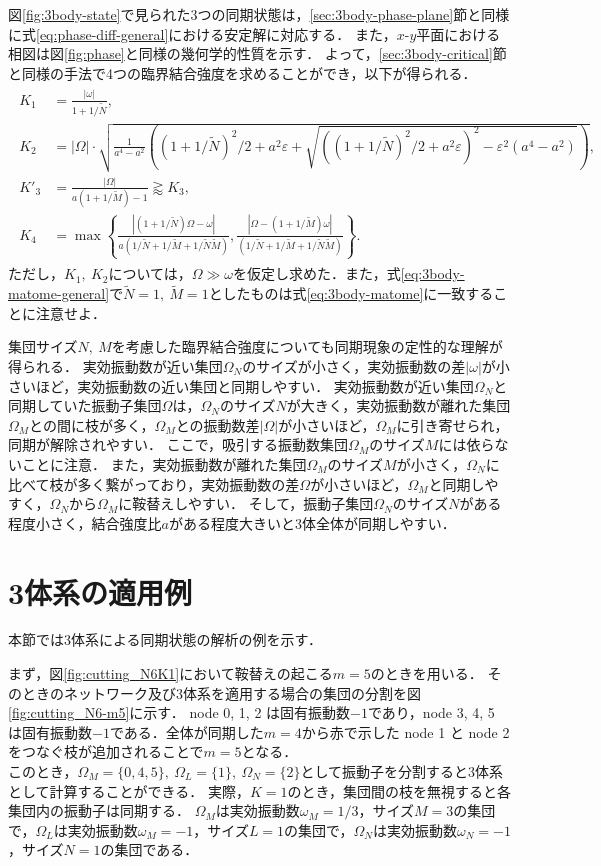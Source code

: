 \documentclass[../main]{subfiles}
\begin{document}
図\ref{fig:3body-state}で見られた3つの同期状態は，\ref{sec:3body-phase-plane}節と同様に式\eqref{eq:phase-diff-general}における安定解に対応する．
また，$x$-$y$平面における相図は図\ref{fig:phase}と同様の幾何学的性質を示す．
よって，\ref{sec:3body-critical}節と同様の手法で4つの臨界結合強度を求めることができ，以下が得られる．
\begin{align}
    \label{eq:3body-matome-general}
    \begin{split}
        K_1&=\frac{|\omega|}{1+1/\tilde{N}},\\
        K_2&=|\Omega|\cdot\sqrt{\frac{1}{a^4-a^2}\left((1+1/\tilde{N})^2/2+a^2\varepsilon+\sqrt{((1+1/\tilde{N})^2/2+a^2\varepsilon)^2-\varepsilon^2(a^4-a^2)}\right)},\\
        K'_3&=\frac{|\Omega|}{a(1+1/\tilde{M})-1}\gtrapprox K_3,\\
        K_4&=\max\left\{\frac{|(1+1/\tilde{N})\Omega-\omega|}{a(1/\tilde{N}+1/\tilde{M}+1/\tilde{N}\tilde{M})},\frac{|\Omega-(1+1/\tilde{M})\omega|}{(1/\tilde{N}+1/\tilde{M}+1/\tilde{N}\tilde{M})}\right\}.
    \end{split}
\end{align}
ただし，$K_1,\ K_2$については，$\Omega\gg\omega$を仮定し求めた．また，式\eqref{eq:3body-matome-general}で$\tilde{N}=1,\ \tilde{M}=1$としたものは式\eqref{eq:3body-matome}に一致することに注意せよ．

集団サイズ$N,\ M$を考慮した臨界結合強度についても同期現象の定性的な理解が得られる．
実効振動数が近い集団$\Omega_N$のサイズが小さく，実効振動数の差$|\omega|$が小さいほど，実効振動数の近い集団と同期しやすい．
実効振動数が近い集団$\Omega_N$と同期していた振動子集団$\Omega$は，$\Omega_N$のサイズ$N$が大きく，実効振動数が離れた集団$\Omega_M$との間に枝が多く，$\Omega_M$との振動数差$|\Omega|$が小さいほど，$\Omega_M$に引き寄せられ，同期が解除されやすい．
ここで，吸引する振動数集団$\Omega_M$のサイズ$M$には依らないことに注意．
また，実効振動数が離れた集団$\Omega_M$のサイズ$M$が小さく，$\Omega_N$に比べて枝が多く繋がっており，実効振動数の差$\Omega$が小さいほど，$\Omega_M$と同期しやすく，$\Omega_N$から$\Omega_M$に鞍替えしやすい．
そして，振動子集団$\Omega_N$のサイズ$N$がある程度小さく，結合強度比$a$がある程度大きいと3体全体が同期しやすい．

\section{3体系の適用例}
本節では3体系による同期状態の解析の例を示す．

まず，図\ref{fig:cutting_N6K1}において鞍替えの起こる$m=5$のときを用いる．
そのときのネットワーク及び3体系を適用する場合の集団の分割を図\ref{fig:cutting_N6-m5}に示す．
node 0, 1, 2 は固有振動数$-1$であり，node 3, 4, 5 は固有振動数$-1$である．全体が同期した$m=4$から赤で示した node 1 と node 2 をつなぐ枝が追加されることで$m=5$となる．\\
このとき，$\Omega_M=\{0,4,5\},\ \Omega_L=\{1\},\ \Omega_N=\{2\}$として振動子を分割すると3体系として計算することができる．
実際，$K=1$のとき，集団間の枝を無視すると各集団内の振動子は同期する．
$\Omega_M$は実効振動数$\omega_M=1/3$，サイズ$M=3$の集団で，$\Omega_L$は実効振動数$\omega_M=-1$，サイズ$L=1$の集団で，$\Omega_N$は実効振動数$\omega_N=-1$，サイズ$N=1$の集団である．
\end{document}
